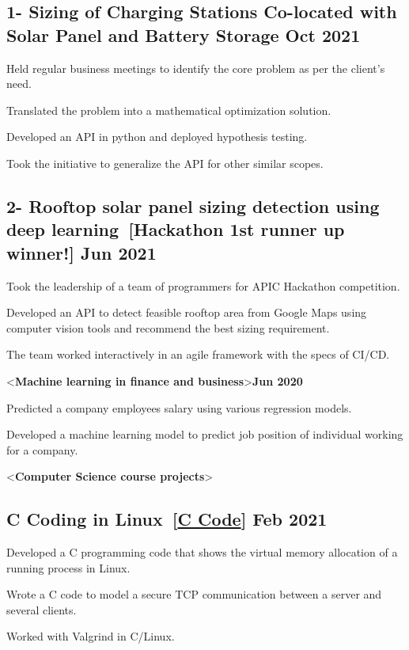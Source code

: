 \documentclass[letter,11pt]{article}
\begin{document}
	\subsection{1- Sizing of Charging Stations Co-located with Solar Panel and Battery Storage \hfill Oct 2021}
\begin{zitemize}
	\item Held regular business meetings to identify the core problem as per the client's need.
	\item Translated the problem into a mathematical optimization solution.
	\item Developed an API in python and deployed hypothesis testing.
	\item Took the initiative to generalize the API for other similar scopes.
\end{zitemize}

\subsection{2- Rooftop solar panel sizing detection using deep learning~[Hackathon 1st runner up winner!] \hfill Jun 2021}
\begin{zitemize}
 \item Took the leadership of a team of programmers for APIC Hackathon competition.
	\item Developed an API to detect feasible rooftop area from Google Maps using computer vision tools and recommend the best sizing requirement. 
	\item The team worked interactively in an agile framework with the specs of CI/CD.
\end{zitemize}

<\textbf{Machine learning in finance and business}>\hfill \textbf{Jun 2020}\vspace{-0.75em}
\begin{zitemize}
	\item Predicted a company employees salary using various regression models.
	\item Developed a machine learning model to predict job position of individual working for a company.
\end{zitemize}
<\textbf{Computer Science course projects}>
\subsection{C Coding in Linux~[\href{https://github.com/Hadi2525/vmemory_maps}{C Code}] \hfill Feb 2021}
\begin{zitemize}
	\item Developed a C programming code that shows the virtual memory allocation of a running process in Linux. 
	\item Wrote a C code to model a secure TCP communication between a server and several clients.
	\item Worked with Valgrind in C/Linux.
\end{zitemize}
\end{document}
